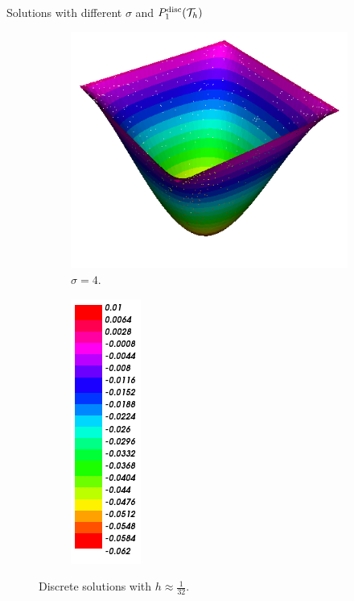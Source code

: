 \begin{frame}{Solutions with different $\sigma$ and $\relax{P}^{\text{disc}}_1(\mathcal{T}_h)$}
\begin{figure}[h!]
\begin{subfigure}[b]{0.27\textwidth}
				\includegraphics[scale=0.18]{img/Difusion/Recortes/steady_diffusion_approx_sigma_4.png}
				\caption{\scriptsize $\sigma=4$.}
			\end{subfigure}
			\begin{subfigure}[b]{0.15\textwidth}
				\centering
				\includegraphics[scale=0.23]{img/Difusion/Recortes/steady_diffusion_values.png}
			\end{subfigure}
			\caption{\scriptsize Discrete solutions with $h\approx\frac{1}{32}$.}
		\end{figure}
		
		\end{frame}
		
